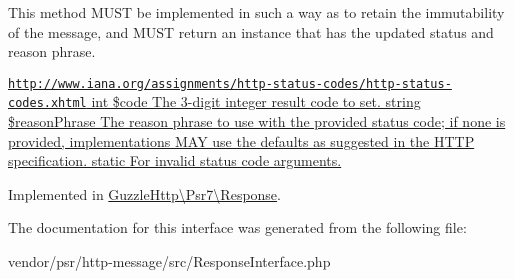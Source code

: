 This method M\+U\+ST be implemented in such a way as to retain the immutability of the message, and M\+U\+ST return an instance that has the updated status and reason phrase.

\hyperlink{}{\href{http://www.iana.org/assignments/http-status-codes/http-status-codes.xhtml}{\tt http\+://www.\+iana.\+org/assignments/http-\/status-\/codes/http-\/status-\/codes.\+xhtml}  int \$code The 3-\/digit integer result code to set.  string \$reason\+Phrase The reason phrase to use with the provided status code; if none is provided, implementations M\+AY use the defaults as suggested in the H\+T\+TP specification.  static   For invalid status code arguments. }

Implemented in \hyperlink{classGuzzleHttp_1_1Psr7_1_1Response_ac436d34fd685d7a4ddfe5931ecd58538}{Guzzle\+Http\textbackslash{}\+Psr7\textbackslash{}\+Response}.



The documentation for this interface was generated from the following file\+:\begin{DoxyCompactItemize}
\item 
vendor/psr/http-\/message/src/Response\+Interface.\+php\end{DoxyCompactItemize}
